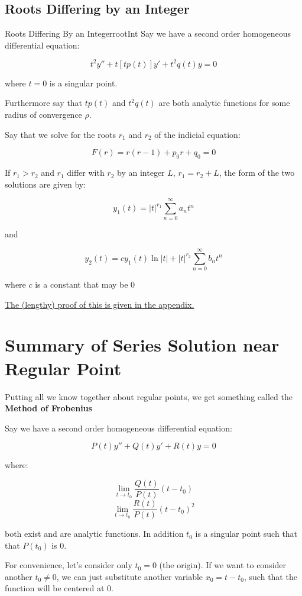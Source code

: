 \documentclass{report}
\begin{document}
{\subsection{Roots Differing by an Integer}

\begin{mytheo}{Roots Differing By an Integer}{rootInt}
	Say we have a second order homogeneous differential equation:
	
	$$t^2y'' + t[tp(t)]y' + t^2q(t)y = 0$$
	
	where $t = 0$ is a singular point.
	
	Furthermore say that $tp(t)$ and $t^2q(t)$ are both analytic functions for some radius of convergence $\rho$.
	
	Say that we solve for the roots $r_1$ and $r_2$ of the indicial equation:
	
	$$F(r) = r(r-1) + p_0r + q_0 = 0$$
	
	If $r_1 > r_2$ and $r_1$ differ with $r_2$ by an integer $L$, $r_1 = r_2 + L$, the form of the two solutions are given by:
	
	$$y_1(t) = |t|^{r_1}\sum_{n=0}^\infty a_nt^n$$
	
	and 
	
	$$y_2(t) = cy_1(t)\ln|t| + |t|^{r_2}\sum_{n=0}^\infty b_nt^n$$
	
	where $c$ is a constant that may be 0
	
	
\end{mytheo}


\hyperref[sec:prRootInt]{The (lengthy) proof of this is given in the appendix.}

\section{Summary of Series Solution near Regular Point}

Putting all we know together about regular points, we get something called the \textbf{Method of Frobenius}


	Say we have a second order homogeneous differential equation:
	
	$$P(t)y'' + Q(t)y' + R(t)y = 0$$
	
	where:
	
	$$\lim_{t \to t_0} \frac{Q(t)}{P(t)}(t-t_0)
	$$
	$$\lim_{t \to t_0} \frac{R(t)}{P(t)}(t-t_0)^2
	$$
	
	both exist and are analytic functions. In addition $t_0$ is a singular point such that that $P(t_0)$ is 0.
	
	For convenience, let's consider only $t_0 = 0$ (the origin). If we want to consider another $t_0 \neq 0$, we can just substitute another variable $x_0 = t-t_0$, such that the function will be centered at 0.
	
}
\end{document}
